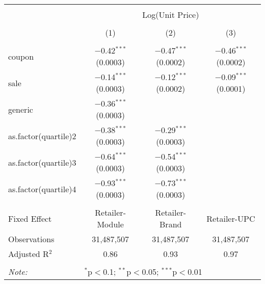 
\begin{table}[!htbp] \centering 
  \caption{} 
  \label{tab:overallSavingsStorable} 
\begin{tabular}{@{\extracolsep{5pt}}lccc} 
\\[-1.8ex]\hline 
\hline \\[-1.8ex] 
 & \multicolumn{3}{c}{Log(Unit Price)} \\ 
\\[-1.8ex] & (1) & (2) & (3)\\ 
\hline \\[-1.8ex] 
 coupon & $-$0.42$^{***}$ (0.0003) & $-$0.47$^{***}$ (0.0002) & $-$0.46$^{***}$ (0.0002) \\ 
  sale & $-$0.14$^{***}$ (0.0003) & $-$0.12$^{***}$ (0.0002) & $-$0.09$^{***}$ (0.0001) \\ 
  generic & $-$0.36$^{***}$ (0.0003) &  &  \\ 
  as.factor(quartile)2 & $-$0.38$^{***}$ (0.0003) & $-$0.29$^{***}$ (0.0003) &  \\ 
  as.factor(quartile)3 & $-$0.64$^{***}$ (0.0003) & $-$0.54$^{***}$ (0.0003) &  \\ 
  as.factor(quartile)4 & $-$0.93$^{***}$ (0.0003) & $-$0.73$^{***}$ (0.0003) &  \\ 
 \hline \\[-1.8ex] 
Fixed Effect & Retailer-Module & Retailer-Brand & Retailer-UPC \\ 
Observations & 31,487,507 & 31,487,507 & 31,487,507 \\ 
Adjusted R$^{2}$ & 0.86 & 0.93 & 0.97 \\ 
\hline 
\hline \\[-1.8ex] 
\textit{Note:}  & \multicolumn{3}{l}{$^{*}$p$<$0.1; $^{**}$p$<$0.05; $^{***}$p$<$0.01} \\ 
\end{tabular} 
\end{table} 
